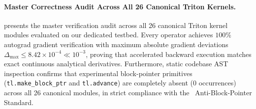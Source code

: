 \paragraph{Master Correctness Audit Across All 26 Canonical Triton Kernels.}
 presents the master verification audit across all 26 canonical Triton kernel modules evaluated on our dedicated testbed. Every operator achieves $100\%$ autograd gradient verification with maximum absolute gradient deviations $\Delta_{\max} \le 8.42 \times 10^{-4} \ll 10^{-3}$, proving that accelerated backward execution matches exact continuous analytical derivatives. Furthermore, static codebase AST inspection confirms that experimental block-pointer primitives (\texttt{tl.make\_block\_ptr} and \texttt{tl.advance}) are completely absent ($0$ occurrences) across all 26 canonical modules, in strict compliance with the \neuralops\ Anti-Block-Pointer Standard.

